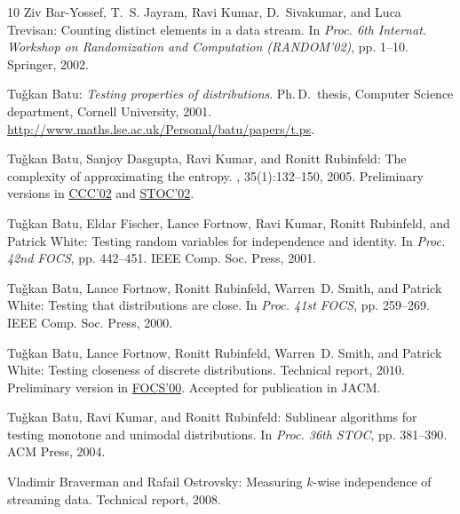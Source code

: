 \begin{thebibliography}{10}
{\sc Ziv Bar-Yossef, T.~S. Jayram, Ravi Kumar, D.~Sivakumar, and Luca
  Trevisan}: Counting distinct elements in a data stream.
\newblock In {\em Proc. 6th Internat. Workshop on Randomization and Computation
  (RANDOM'02)}, pp. 1--10. Springer, 2002.
\newblock [\epfmtdoi{10.1007/3-540-45726-7\_1}]

{\sc Tu\v{g}kan Batu}: {\em Testing properties of distributions}.
\newblock Ph.\,D.\ thesis, Computer Science department, Cornell University,
  2001.
\newblock \url{http://www.maths.lse.ac.uk/Personal/batu/papers/t.ps}.

{\sc Tu\v{g}kan Batu, Sanjoy Dasgupta, Ravi Kumar, and Ronitt Rubinfeld}: The
  complexity of approximating the entropy.
, 35(1):132--150, 2005.
\newblock Preliminary versions in
  \href{http://dx.doi.org/10.1109/CCC.2002.1004329}{CCC'02} and
  \href{http://dx.doi.org/10.1145/509907.510005}{STOC'02}.
\newblock [\epfmtdoi{10.1137/S0097539702403645}]

{\sc Tu\v{g}kan Batu, Eldar Fischer, Lance Fortnow, Ravi Kumar, Ronitt
  Rubinfeld, and Patrick White}: Testing random variables for independence and
  identity.
\newblock In {\em Proc. 42nd FOCS}, pp. 442--451. IEEE Comp. Soc. Press, 2001.

{\sc Tu\v{g}kan Batu, Lance Fortnow, Ronitt Rubinfeld, Warren~D. Smith, and
  Patrick White}: Testing that distributions are close.
\newblock In {\em Proc. 41st FOCS}, pp. 259--269. IEEE Comp. Soc. Press, 2000.

{\sc Tu\v{g}kan Batu, Lance Fortnow, Ronitt Rubinfeld, Warren~D. Smith, and
  Patrick White}: Testing closeness of discrete distributions.
\newblock Technical report, 2010.
\newblock Preliminary version in
  \href{http://dx.doi.org/10.1109/SFCS.2000.892113}{FOCS'00}. Accepted for
  publication in JACM.

{\sc Tu\v{g}kan Batu, Ravi Kumar, and Ronitt Rubinfeld}: Sublinear algorithms
  for testing monotone and unimodal distributions.
\newblock In {\em Proc. 36th STOC}, pp. 381--390. ACM Press, 2004.
\newblock [\epfmtdoi{10.1145/1007352.1007414}]

{\sc Vladimir Braverman and Rafail Ostrovsky}: Measuring $k$-wise independence
  of streaming data.
\newblock Technical report, 2008.


\end{thebibliography}
